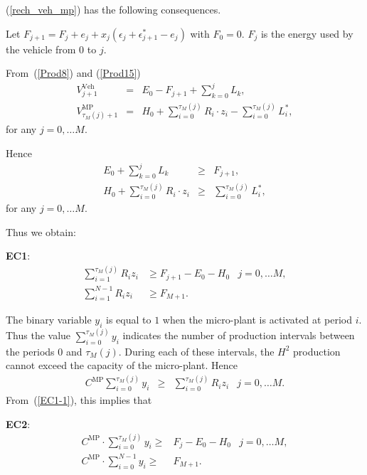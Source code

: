 \documentclass[11pt]{article}
\theoremstyle{plain}%
\theoremstyle{definition} \newtheorem{lem}{Lemma}[section]
\theoremstyle{definition} \newtheorem{claim}{Claim}[lem]
\theoremstyle{definition} \newtheorem{theorem}{Theorem}[section]
\theoremstyle{definition} \newtheorem{exo}{Exercice n$^\circ$}
\theoremstyle{definition} \newtheorem{quest}{}[exo]
\theoremstyle{definition} \newtheorem{sousquest}{}[quest]
\theoremstyle{remark}
\theoremstyle{definition}
\begin{document}
(\ref{rech_veh_mp}) has the following consequences.

Let $F_{j+1}= F_j+e_j+x_j(\epsilon_j+\epsilon^*_{j+1}-e_j)$ with $F_0=0$. $F_{j}$ is the energy used by the vehicle from $0$ to $j$.
 
From~(\ref{Prod8}) and (\ref{Prod15})
\begin{eqnarray}
V_{j+1}^{\textrm{Veh}} & = &  E_0 - F_{j+1} + \sum_{k=0}^{j} L_k, \nonumber \\
V^{\textrm{MP}}_{\tau_M(j)+1} & = &  H_0 + \sum_{i=0}^{\tau_M(j) }  R_i \cdot z_i -  \sum_{i=0}^{\tau_M(j)} L^*_i,  \nonumber	
\end{eqnarray}
for any $j = 0, \ldots M$.

Hence
\begin{eqnarray}
 E_0  + \sum_{k=0}^{j} L_k & \geq &   F_{j+1}, \nonumber \\
H_0 + \sum_{i=0}^{\tau_M(j) }  R_i \cdot z_i & \geq  &  \sum_{i=0}^{\tau_M(j)} L^*_i,  	\nonumber	
\end{eqnarray}
 for  any $ j = 0, \ldots M $. 

Thus we obtain:

\textbf {EC1}: 
\begin{eqnarray}
\sum_{i=1}^{\tau_M(j)} R_i z_i  & \ge  F_{j+1}-E_0-H_0 & j=0,\ldots M,  \label{EC1-1} \\
\sum_{i=1} ^{N-1} R_i z_i  & \ge   F_{M+1}. &\label{EC1-2} 
\end{eqnarray}

The binary variable $y_i$ is equal to $1$ when the micro-plant is activated at period $i$.
Thus the value $\sum_{i=0}^{\tau_M(j)} y_i$ indicates the number of production intervals between 
the periods $0$ and $\tau_M(j)$. During each of these intervals, the $H^2$ production
cannot exceed the capacity of the micro-plant. Hence
$$ \begin{array}{lclr}
C^{\textrm{MP}} \sum_{i=0}^{\tau_M(j)} y_i & \geq & \sum_{i=0}^{\tau_M(j)} R_i z_i  & j=0,\ldots M.
\end{array}
$$
From~(\ref{EC1-1}), this implies that

\textbf {EC2}:
\begin{eqnarray}
C^{\textrm{MP}} \cdot \sum_{i=0}^{ \tau_M(j)} y_i \ge & F_j - E_0 - H_0 & j=0,\ldots M,  \label{EC2-1} \\
C^{\textrm{MP}} \cdot \sum_{i=0}^{ N-1} y_i  \ge & F_{M+1}.  \label{EC2-2} 
\end{eqnarray}
\end{document}

